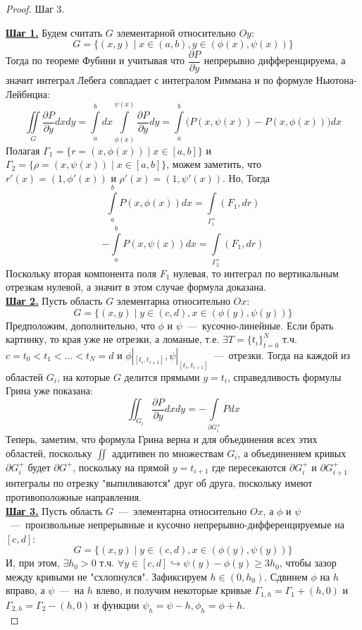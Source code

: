\begin{proof}
\begin{minipage}{0.365\textwidth}
Шаг 3.
\end{minipage}
\vspace{10pt}

\textbf{\underline{Шаг 1.}} Будем считать $G$ элементарной относительно $Oy$: \[G = \{(x, y) \mid x \in (a, b), y \in (\phi(x), \psi(x))\}\] Тогда по теореме Фубини и учитывая что $\dfrac{\partial P}{\partial y}$ непрерывно дифференцируема, а значит интеграл Лебега совпадает с интегралом Риммана и по формуле Ньютона-Лейбнциа:\[\iint\limits_G \dfrac{\partial P}{\partial y}dxdy = \int\limits_{a}^b dx\int\limits_{\phi(x)}^{\psi(x)} \dfrac{\partial P}{\partial y} dy = \int\limits_a^b \Big( P(x, \psi(x)) - P(x, \phi(x)) \Big) dx\]
Полагая $\Gamma_1 = \{r = (x, \phi(x)) \mid x \in [a, b]\}$ и $\Gamma_2 = \{\rho = (x, \psi(x)) \mid x \in [a, b]\}$, можем заметить, что $r'(x) = (1, \phi'(x))$ и $\rho'(x) = (1, \psi'(x))$. Но, Тогда \[\int\limits_a^b P(x, \phi(x))dx = \int\limits_{\Gamma_1^+} (F_1, dr)\]
    \[-\int\limits_a^b P(x, \psi(x))dx = \int\limits_{\Gamma_2^+} (F_1, dr)\]
    Поскольку вторая компонента поля $F_1$ нулевая, то интеграл по вертикальным отрезкам нулевой, а значит в этом случае формула доказана.\\
    \textbf{\underline{Шаг 2.}} Пусть область $G$ элементарна относительно $Ox$: \[G = \{(x, y) \mid y \in (c, d), x \in (\phi(y), \psi(y))\}\]
        Предположим, дополнительно, что $\phi$ и $\psi$~---~кусочно-линейные. Если брать картинку, то края уже не отрезки, а ломаные, т.е. $\exists T = \{t_i\}_{t = 0}^{N}$ т.ч. $c = t_0 < t_1 < \ldots < t_N = d$ и $\phi|_{[t_i, t_{i + 1}]}, \psi|_{[t_i, t_{i + 1}]}$~---~отрезки. Тогда на каждой из областей $G_i$, на которые $G$ делится прямыми $y = t_i$, справедливость формулы Грина уже показана: \[\iint_{G_i} \dfrac{\partial P}{\partial y}dxdy = - \int\limits_{\partial G_i^+} Pdx\]
        Теперь, заметим, что формула Грина верна и для объединения всех этих областей, поскольку $\iint$ аддитивен по множествам $G_i$, а объединением кривых $\partial G_i^+$ будет $\partial G^+$, поскольку на прямой $y = t_{i + 1}$ где пересекаются $\partial G_i^+$ и $\partial G_{i + 1}^+$ интегралы по отрезку "выпиливаются" друг об друга, поскольку имеют противоположные направления. \\
    \textbf{\underline{Шаг 3.}} Пусть область $G$~---~элементарна относительно $Ox$, а $\phi$ и $\psi$~---~произвольные непрерывные и кусочно непрерывно-дифференцируемые на $[c, d]$: \[G = \{(x, y) \mid y \in (c, d), x \in (\phi(y), \psi(y))\}\]
        И, при этом, $\exists h_0 > 0$ т.ч. $\forall y \in [c, d] \hookrightarrow \psi(y) - \phi(y) \geq 3h_0$, чтобы зазор между кривыми не "схлопнулся". Зафиксируем $h \in (0, h_0)$. Сдвинем $\phi$ на $h$ вправо, а $\psi$~---~на $h$ влево, и получим некоторые кривые $\Gamma_{1, h} = \Gamma_1 + (h, 0)$ и $\Gamma_{2, h} = \Gamma_2 - (h, 0)$ и функции $\psi_h = \psi - h, \phi_h = \phi + h$.\\

\end{proof}
